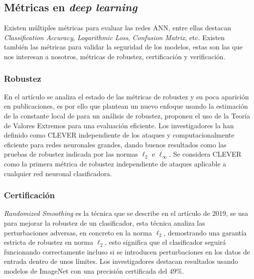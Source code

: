 
\subsection{Métricas en \textit{deep learning}}

Existen múltiples métricas para evaluar las redes \acrshort{ANN}, entre ellas destacan \textit{Classification Accuracy}, \textit{Logarithmic Loss}, \textit{Confusion Matrix}, etc. Existen también las métricas para validar la seguridad de los modelos, estas son las que nos interesan a nosotros, métricas de robustez, certificación y verificación.


\subsubsection{Robustez}

En el artículo \cite{weng2018evaluating} se analiza el estado de las métricas de robustez y su poca aparición en publicaciones, es por ello que plantean un nuevo enfoque usando la estimación de la constante local de  para un análisis de robustez, proponen el uso de la Teoría de Valores Extremos para una evaluación eficiente. Los investigadores la han definido como \gls{CLEVER} independiente de los ataques y computacionalmente eficiente para redes neuronales grandes, dando buenos resultados como las pruebas de robustez indicada por las normas ${\ell_{2}}$ e ${\ell_{\infty}}$. Se considera \gls{CLEVER} como la primera métrica de robustez independiente de ataques aplicable a cualquier red neuronal clasificadora.

\subsubsection{Certificación}

\textit{Randomized Smoothing}  \cite{cohen2019certified} es la técnica que se describe en el artículo de 2019, se usa para mejorar la robustez de un clasificador, esta técnica analiza las perturbaciones adversas, en concreto en la norma ${\ell_{2}}$, demostrando una garantía estricta de robustez en norma ${\ell_{2}}$, esto significa que el clasificador seguirá funcionando correctamente incluso si se introducen perturbaciones en los datos de entrada dentro de unos límites. Los investigadores destacan resultados usando modelos de \gls{ImageNet} con una precisión certificada del ${49\%}$.


